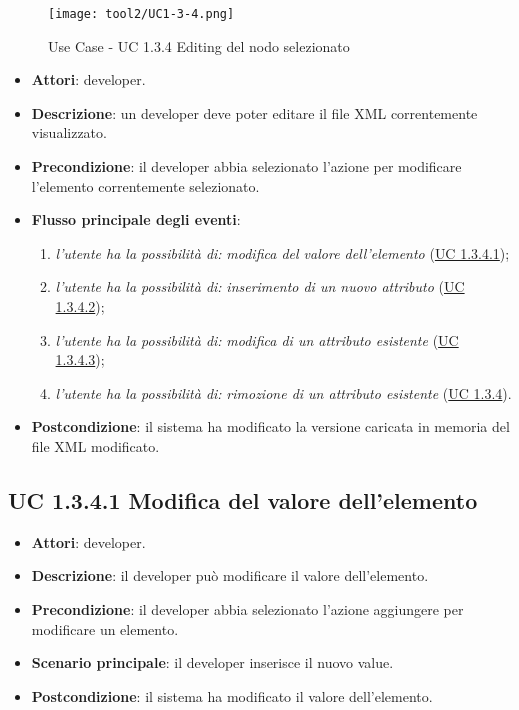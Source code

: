 		\begin{figure}[!h] 
			\centering 
			\texttt{[image: tool2/UC1-3-4.png]} 
			\caption{Use Case - UC 1.3.4 Editing del nodo selezionato}
		\end{figure}
		
		\begin{itemize}
			\item\textbf{Attori}: developer.
			\item\textbf{Descrizione}: un developer deve poter editare il file XML correntemente visualizzato.
			\item\textbf{Precondizione}: il developer abbia selezionato l'azione per modificare l'elemento correntemente selezionato.
			\item\textbf{Flusso principale degli eventi}: 
			\begin{enumerate}
				\item \textit{l'utente ha la possibilità di:} \textit{modifica del valore dell'elemento} (\hyperref[subsec:XEUC1.3.4.1]{UC 1.3.4.1});
				
				\item \textit{l'utente ha la possibilità di:} \textit{inserimento di un nuovo attributo} (\hyperref[subsec:XEUC1.3.4.2]{UC 1.3.4.2});
				
				\item \textit{l'utente ha la possibilità di:} \textit{modifica di un attributo esistente} (\hyperref[subsec:XEUC1.3.4.3]{UC 1.3.4.3});
				
				\item \textit{l'utente ha la possibilità di:} \textit{rimozione di un attributo esistente} (\hyperref[subsec:XEUC1.3.4.4]{UC 1.3.4}).
				
			\end{enumerate}
			\item\textbf{Postcondizione}: il sistema ha modificato la versione caricata in memoria del file XML modificato.
		\end{itemize}
		
	\subsection{UC 1.3.4.1 Modifica del valore dell'elemento}
		\label{subsec:XEUC1.3.4.1}
		
		\begin{itemize}
			\item\textbf{Attori}: developer.
			\item\textbf{Descrizione}: il developer può modificare il valore dell'elemento.
			\item\textbf{Precondizione}: il developer abbia selezionato l'azione aggiungere per modificare un elemento.
			\item\textbf{Scenario principale}: il developer inserisce il nuovo value.
			\item\textbf{Postcondizione}: il sistema ha modificato il valore dell'elemento.
		\end{itemize}
		
